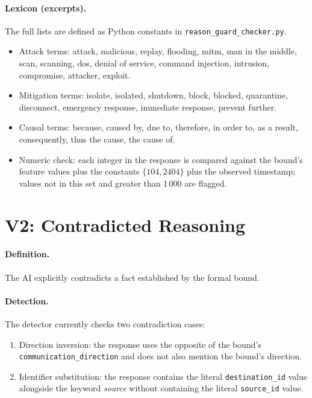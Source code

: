 \paragraph{Lexicon (excerpts).}
The full lists are defined as Python constants in
\texttt{reason\_guard\_checker.py}.

\begin{itemize}
  \item Attack terms: attack, malicious, replay, flooding, mitm,
        man in the middle, scan, scanning, dos, denial of service,
        command injection, intrusion, compromise, attacker, exploit.
  \item Mitigation terms: isolate, isolated, shutdown, block, blocked,
        quarantine, disconnect, emergency response, immediate response,
        prevent further.
  \item Causal terms: because, caused by, due to, therefore, in order to,
        as a result, consequently, thus the cause, the cause of.
  \item Numeric check: each integer in the response is compared against the
        bound's feature values plus the constants $\{104, 2404\}$ plus the
        observed timestamp; values not in this set and greater than 1\,000
        are flagged.
\end{itemize}

\section{V2: Contradicted Reasoning}
\label{sec:appendix-v2}

\paragraph{Definition.}
The AI explicitly contradicts a fact established by the formal bound.

\paragraph{Detection.}
The detector currently checks two contradiction cases:

\begin{enumerate}
  \item Direction inversion: the response uses the opposite of the bound's
        \texttt{communication\_direction} and does not also mention the
        bound's direction.
  \item Identifier substitution: the response contains the literal
        \texttt{destination\_id} value alongside the keyword \emph{source}
        without containing the literal \texttt{source\_id} value.
\end{enumerate}

